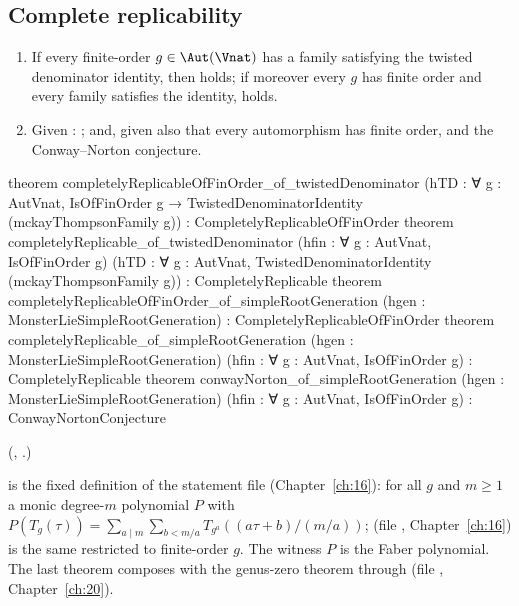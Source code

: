 \subsection{Complete replicability}

\begin{theorem}\label{ch19:thm:completerep}
\begin{enumerate}[label=(\alph*)]
\item If every finite-order $g\in\Aut(\Vnat)$ has a family satisfying the twisted denominator identity, then
   holds; if moreover every $g$ has finite order and every family satisfies the identity,
   holds.
\item Given : ; and, given also that every
  automorphism has finite order,  and the Conway--Norton conjecture.
\end{enumerate}
\end{theorem}
\begin{leancode}
theorem completelyReplicableOfFinOrder_of_twistedDenominator
    (hTD : ∀ g : AutVnat, IsOfFinOrder g → TwistedDenominatorIdentity (mckayThompsonFamily g)) :
    CompletelyReplicableOfFinOrder
theorem completelyReplicable_of_twistedDenominator (hfin : ∀ g : AutVnat, IsOfFinOrder g)
    (hTD : ∀ g : AutVnat, TwistedDenominatorIdentity (mckayThompsonFamily g)) :
    CompletelyReplicable
theorem completelyReplicableOfFinOrder_of_simpleRootGeneration
    (hgen : MonsterLieSimpleRootGeneration) : CompletelyReplicableOfFinOrder
theorem completelyReplicable_of_simpleRootGeneration (hgen : MonsterLieSimpleRootGeneration)
    (hfin : ∀ g : AutVnat, IsOfFinOrder g) : CompletelyReplicable
theorem conwayNorton_of_simpleRootGeneration (hgen : MonsterLieSimpleRootGeneration)
    (hfin : ∀ g : AutVnat, IsOfFinOrder g) : ConwayNortonConjecture
\end{leancode}
(, .)
\begin{dictionary}
 is the fixed definition of the statement file (Chapter~\ref{ch:16}): for all $g$ and $m\ge1$ a monic
degree-$m$ polynomial $P$ with $P(T_g(\tau))=\sum_{a\mid m}\sum_{b<m/a}T_{g^a}((a\tau+b)/(m/a))$; 
(file , Chapter~\ref{ch:16}) is the same restricted to finite-order $g$.  The
witness $P$ is the Faber polynomial.  The last theorem composes with the genus-zero theorem through
 (file , Chapter~\ref{ch:20}).
\end{dictionary}
